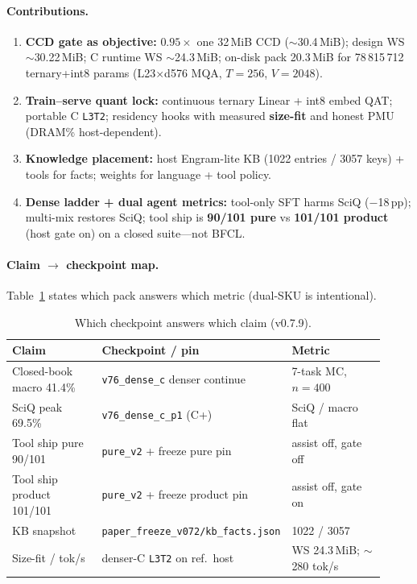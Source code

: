 \documentclass[11pt,a4paper]{article}
\begin{document}
\paragraph{Contributions.}
\begin{enumerate}[leftmargin=*,itemsep=1.5pt]
  \item \textbf{CCD gate as objective:} $0.95\times$ one 32\,MiB CCD ($\sim$30.4\,MiB); design WS $\sim$30.22\,MiB; C runtime WS $\sim$24.3\,MiB; on-disk pack 20.3\,MiB for 78\,815\,712 ternary+int8 params (L23$\times$d576 MQA, $T{=}256$, $V{=}2048$).
  \item \textbf{Train--serve quant lock:} continuous ternary Linear + int8 embed QAT; portable C \texttt{L3T2}; residency hooks with measured \textbf{size-fit} and honest PMU (DRAM\% host-dependent).
  \item \textbf{Knowledge placement:} host Engram-lite KB (1022 entries / 3057 keys) + tools for facts; weights for language + tool policy.
  \item \textbf{Dense ladder + dual agent metrics:} tool-only SFT harms SciQ ($-$18\,pp); multi-mix restores SciQ; tool ship is \textbf{90/101 pure} vs \textbf{101/101 product} (host gate on) on a closed suite---not BFCL.
\end{enumerate}

\paragraph{Claim $\rightarrow$ checkpoint map.}
Table~\ref{tab:claimmap} states which pack answers which metric (dual-SKU is intentional).
\begin{table}[H]
\centering
\caption{Which checkpoint answers which claim (v0.7.9).}
\label{tab:claimmap}
\small
\setlength{\tabcolsep}{3pt}
\begin{tabular}{@{}p{0.28\linewidth}p{0.34\linewidth}p{0.30\linewidth}@{}}
\toprule
Claim & Checkpoint / pin & Metric \\
\midrule
Closed-book macro 41.4\% & \texttt{v76\_dense\_c} denser continue & 7-task MC, $n{=}400$ \\
SciQ peak 69.5\% & \texttt{v76\_dense\_c\_p1} (C+) & SciQ / macro flat \\
Tool ship pure 90/101 & \texttt{pure\_v2} + freeze pure pin & assist off, gate off \\
Tool ship product 101/101 & \texttt{pure\_v2} + freeze product pin & assist off, gate on \\
KB snapshot & \texttt{paper\_freeze\_v072/kb\_facts.json} & 1022 / 3057 \\
Size-fit / tok/s & denser-C \texttt{L3T2} on ref.\ host & WS 24.3\,MiB; $\sim$280 tok/s \\
\bottomrule
\end{tabular}
\end{table}
\end{document}

